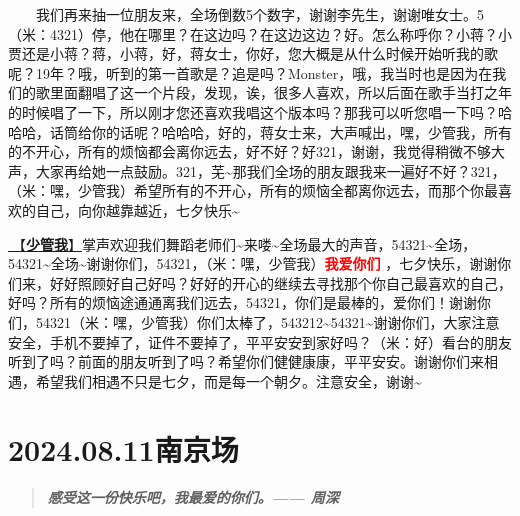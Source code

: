 \documentclass[]{ctexbook}
\begin{document}
  我们再来抽一位朋友来，全场倒数5个数字，谢谢李先生，谢谢唯女士。5（米：4321）停，他在哪里？在这边吗？在这边这边？好。怎么称呼你？小蒋？小贾还是小蒋？蒋，小蒋，好，蒋女士，你好，您大概是从什么时候开始听我的歌呢？19年？哦，听到的第一首歌是？追是吗？Monster，哦，我当时也是因为在我们的歌里面翻唱了这一个片段，发现，诶，很多人喜欢，所以后面在歌手当打之年的时候唱了一下，所以刚才您还喜欢我唱这个版本吗？那我可以听您唱一下吗？哈哈哈，话筒给你的话呢？哈哈哈，好的，蒋女士来，大声喊出，嘿，少管我，所有的不开心，所有的烦恼都会离你远去，好不好？好321，谢谢，我觉得稍微不够大声，大家再给她一点鼓励。321，芜\textasciitilde 那我们全场的朋友跟我来一遍好不好？321，（米：嘿，少管我）希望所有的不开心，所有的烦恼全都离你远去，而那个你最喜欢的自己，向你越靠越近，七夕快乐\textasciitilde{}

\hyperref[watch-ur-manners]{🎵【\textbf{少管我}】}掌声欢迎我们舞蹈老师们\textasciitilde 来喽\textasciitilde 全场最大的声音，54321\textasciitilde 全场，54321\textasciitilde 全场\textasciitilde 谢谢你们，54321，（米：嘿，少管我）\textbf{\textcolor{red}{我爱你们} }，七夕快乐，谢谢你们来，好好照顾好自己好吗？好好的开心的继续去寻找那个你自己最喜欢的自己，好吗？所有的烦恼途通通离我们远去，54321，你们是最棒的，爱你们！谢谢你们，54321（米：嘿，少管我）你们太棒了，543212\textasciitilde54321\textasciitilde 谢谢你们，大家注意安全，手机不要掉了，证件不要掉了，平平安安到家好吗？（米：好）看台的朋友听到了吗？前面的朋友听到了吗？希望你们健健康康，平平安安。谢谢你们来相遇，希望我们相遇不只是七夕，而是每一个朝夕。注意安全，谢谢\textasciitilde{}

\chapter{2024.08.11南京场}\label{nanjing-20240811}

\begin{quote}
\textbf{\emph{感受这一份快乐吧，我最爱的你们。------ 周深}}
\end{quote}
\end{document}
